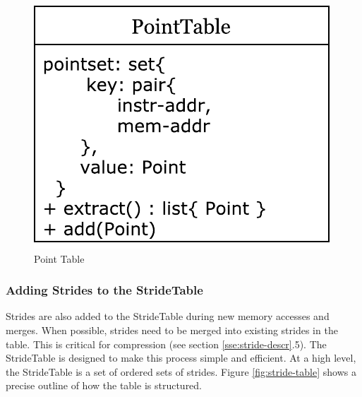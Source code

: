 \documentclass[12pt,twoside]{reedthesis}
\begin{document}
			\begin{figure}[h]
				\caption{Point Table}
				\label{fig:point-table}
				\includegraphics[scale=0.8]{point_data.pdf}
			\end{figure}
		
			
			
			
			
		
		\subsubsection{Adding Strides to the StrideTable}
			
			Strides are also added to the StrideTable during new memory accesses and merges. 			
			When possible, strides need to be merged into existing strides in the table. This is critical for compression (see section \ref{sse:stride-descr}.5). The StrideTable is designed to make this process simple and efficient. 
			At a high level, the StrideTable is a set of ordered sets of strides. 
			Figure \ref{fig:stride-table} shows a precise outline of how the table is structured.  %
			
\end{document}
